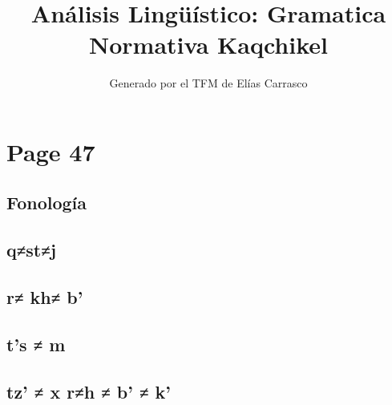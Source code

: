 \documentclass{article}%
\title{Análisis Lingüístico: Gramatica Normativa Kaqchikel}%
\author{Generado por el TFM de Elías Carrasco}%
\begin{document}
%
\normalsize%
\maketitle%
\section{Page 47}%
\label{sec:Page47}%
\subsection{Fonología}%
\label{subsec:Fonologa}%

%
\subsection{q≠st≠j}%
\label{subsec:qstj}%

%
\subsection{r≠ kh≠ b'}%
\label{subsec:rkhb}%

%
\subsection{t's ≠ m}%
\label{subsec:tsm}%

%
\subsection{tz' ≠ x r≠h ≠ b' ≠ k'}%
\label{subsec:tzxrhbk}%

%
\end{document}

